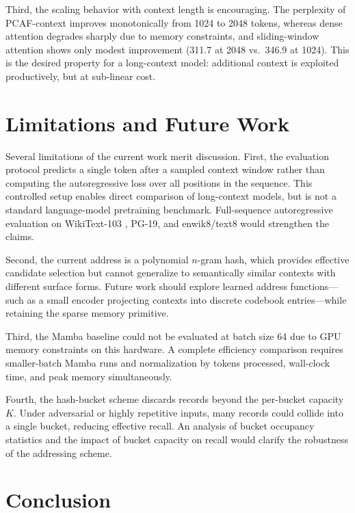 \documentclass{article}
\begin{document}
Third, the scaling behavior with context length is encouraging. The perplexity
of PCAF-context improves monotonically from 1024 to 2048 tokens, whereas dense
attention degrades sharply due to memory constraints, and sliding-window
attention shows only modest improvement (311.7 at 2048 vs.\ 346.9 at 1024).
This is the desired property for a long-context model: additional context
is exploited productively, but at sub-linear cost.

\section{Limitations and Future Work}
\label{sec:limitations}

Several limitations of the current work merit discussion. First, the evaluation
protocol predicts a single token after a sampled context window rather than
computing the autoregressive loss over all positions in the sequence. This
controlled setup enables direct comparison of long-context models, but is not
a standard language-model pretraining benchmark. Full-sequence autoregressive
evaluation on WikiText-103 \citep{merity2016pointer}, PG-19, and
enwik8/text8 would strengthen the claims.

Second, the current address is a polynomial $n$-gram hash, which provides
effective candidate selection but cannot generalize to semantically similar
contexts with different surface forms. Future work should explore learned
address functions—such as a small encoder projecting contexts into discrete
codebook entries—while retaining the sparse memory primitive.

Third, the Mamba baseline could not be evaluated at batch size 64 due to GPU
memory constraints on this hardware. A complete efficiency comparison requires
smaller-batch Mamba runs and normalization by tokens processed, wall-clock
time, and peak memory simultaneously.

Fourth, the hash-bucket scheme discards records beyond the per-bucket capacity
$K$. Under adversarial or highly repetitive inputs, many records could collide
into a single bucket, reducing effective recall. An analysis of bucket
occupancy statistics and the impact of bucket capacity on recall would
clarify the robustness of the addressing scheme.

\section{Conclusion}
\end{document}
